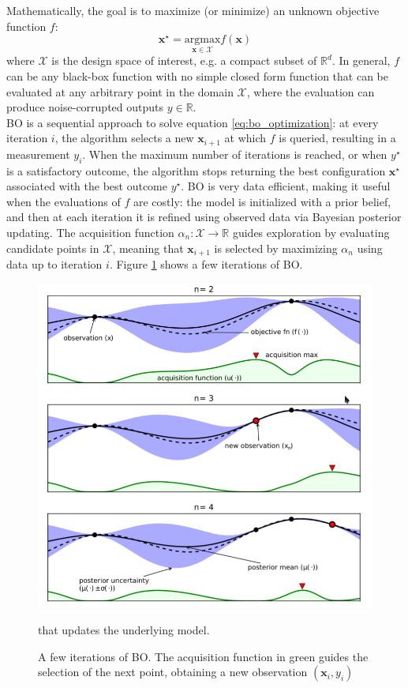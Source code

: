 \documentclass[a4paper]{article} %
\begin{document}
	Mathematically, the goal is to maximize (or minimize) an unknown objective function $f$:\\
	\begin{equation} \label{eq:bo_optimization}
				\pmb{x}^\star = \underset{\pmb{x} \in \mathcal{X}}{\mathrm{argmax}} f(\pmb{x})
	\end{equation}
	where $\mathcal{X}$ is the design space of interest, e.g. a compact subset of $\mathbb{R}^d$. In general, $f$ can be any black-box function with no simple closed form function that can be evaluated at any arbitrary point in the domain $\mathcal{X}$, where the evaluation can produce noise-corrupted outputs $y \in \mathbb{R}$.\\
	BO is a sequential approach to solve equation \ref{eq:bo_optimization}: at every iteration $i$, the algorithm selects a new $\pmb{x}_{i+1}$ at which $f$ is queried, resulting in a measurement $y_i$. When the maximum number of iterations is reached, or when $y^\star$ is a satisfactory outcome, the algorithm stops returning the best configuration $\pmb{x}^\star$ associated with the best outcome $y^\star$. BO is very data efficient, making it useful when the evaluations of $f$ are costly: the model is initialized with a prior belief, and then at each iteration it is refined using observed data via Bayesian posterior updating. The acquisition function $\alpha_n : \mathcal{X} \rightarrow \mathbb{R}$ guides exploration by evaluating candidate points in $\mathcal{X}$, meaning that $\pmb{x}_{i+1}$ is selected by maximizing $\alpha_n$ using data up to iteration $i$. Figure \ref{fig:bo} shows a few iterations of BO.
	\begin{figure} \label{fig:bo}
		\includegraphics[width=\linewidth]{img/bo.png}
		\caption{A few iterations of BO. The acquisition function in green guides the selection of the next point, obtaining a new observation $(\pmb{x}_i, y_i)$} that updates the underlying model.
	\end{figure}
\end{document}
